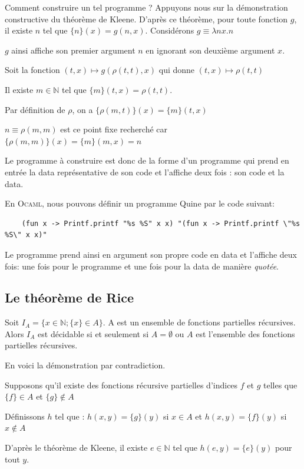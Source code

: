 Comment construire un tel programme ?
Appuyons nous sur la démonstration constructive du théorème de Kleene.
D'après ce théorème, pour toute fonction $g$, il existe $n$ tel que $\{n\}(x)=g(n,x)$. 
Considérons $g\equiv \lambda nx.n$


$g$ ainsi affiche son premier argument $n$ en ignorant son deuxième argument $x$.

Soit la fonction $(t,x) \mapsto g(\rho(t,t),x)$ qui donne $(t,x) \mapsto \rho(t,t)$


Il existe $m \in \mathbb{N}$ tel que $\{m\}(t,x)=\rho(t,t)$.

Par définition de $\rho$, on a $\{ \rho(m,t)\}(x)=\{ m \}(t,x)$


$n\equiv \rho(m,m)$ est ce point fixe recherché car $ \{ \rho(m,m)\} (x) = \{ m \} (m,x) = n $

Le programme à construire est donc de la forme d'un programme qui prend en entrée la data représentative de son code
et l'affiche deux fois : son code et la data.

En \textsc{Ocaml}, nous pouvons définir un programme Quine par le code suivant:
\begin{Verbatim}
	(fun x -> Printf.printf "%s %S" x x) "(fun x -> Printf.printf \"%s %S\" x x)"	
\end{Verbatim}
Le programme prend ainsi en argument son propre code en data et l'affiche deux fois: une fois pour le programme 
et une fois pour la data de manière \textit{quotée}. 

\subsection{Le théorème de Rice}
\begin{theoreme}[Rice]
Soit $I_A=\{ x \in \mathbb{N}; \{x\} \in A \}$. A est un ensemble de fonctions partielles récursives. Alors 
$I_A$ est décidable si et seulement si $A=\emptyset$ ou $A$ est l'ensemble des fonctions partielles récursives.
\end{theoreme}
En voici la démonstration par contradiction.

Supposons qu'il existe  des fonctions récursive partielles d'indices $f$ et $g$ telles que $\{f\}\in A$
 et $\{g\} \notin A$ 

Définissons $h$ tel que :
$h(x,y)=\{g\}(y)$ si $x \in A$ et 
$h(x,y)=\{f\}(y)$ si $x \notin A$  

D'après le théorème de Kleene, il existe $e \in \mathbb{N}$ tel que $h(e,y)=\{ e \}(y)$ pour tout $y$.

